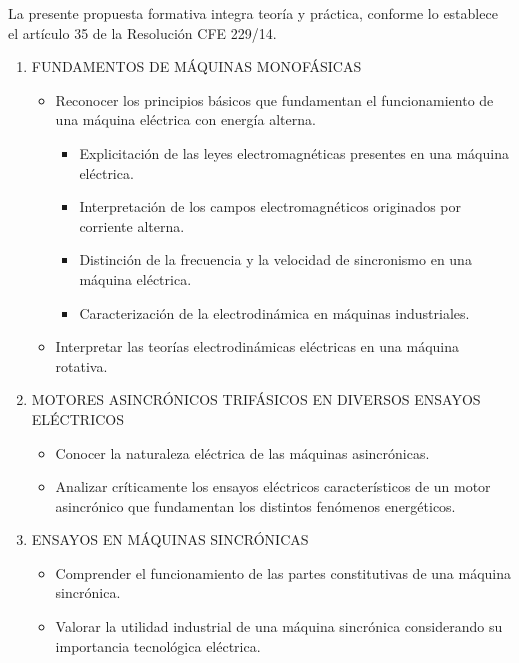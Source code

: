 \documentclass[planificacion2024.tex]{subfiles}
\begin{document}
La presente propuesta formativa integra teoría y práctica, conforme lo
establece el artículo 35 de la Resolución CFE 229/14. 

\begin{enumerate}
    \item FUNDAMENTOS DE MÁQUINAS MONOFÁSICAS
    \begin{itemize}
        \item Reconocer los principios básicos que fundamentan el funcionamiento de una máquina eléctrica con energía alterna.
        \begin{itemize}
            \item Explicitación de las leyes electromagnéticas presentes en
una máquina eléctrica.
            \item Interpretación de los campos electromagnéticos
originados por corriente alterna.
            \item Distinción de la frecuencia y la velocidad de sincronismo
en una máquina eléctrica.
            \item Caracterización de la electrodinámica en máquinas
industriales.
        \end{itemize}
        
        \item Interpretar las teorías electrodinámicas eléctricas en una máquina rotativa.
    \end{itemize}
    \item MOTORES ASINCRÓNICOS TRIFÁSICOS EN DIVERSOS ENSAYOS ELÉCTRICOS
    \begin{itemize}
        \item Conocer la naturaleza
eléctrica de las máquinas
asincrónicas.
        \item Analizar críticamente los
ensayos eléctricos
característicos de un motor
asincrónico que
fundamentan los distintos
fenómenos energéticos.
    
    \end{itemize}
    \item ENSAYOS EN MÁQUINAS SINCRÓNICAS
    \begin{itemize}
        \item Comprender el
funcionamiento de las
partes constitutivas de una
máquina sincrónica.
        \item Valorar la utilidad industrial
de una máquina sincrónica
considerando su
importancia tecnológica
eléctrica.
    \end{itemize}
\end{enumerate}
\end{document}
